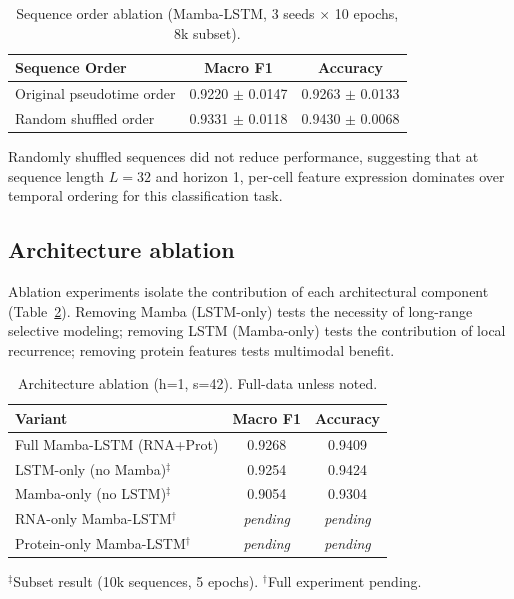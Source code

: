 \documentclass[11pt,twocolumn]{article}
\begin{document}
\begin{table}[tbp]
\centering
\caption{Sequence order ablation (Mamba-LSTM, 3 seeds $\times$ 10 epochs, 8k subset).}
\label{tab:sequence}
\footnotesize
\setlength{\tabcolsep}{3pt}
\renewcommand{\arraystretch}{1.08}
\begin{tabularx}{\columnwidth}{@{}>{\raggedright\arraybackslash}Xcc@{}}
\toprule
\textbf{Sequence Order} & \textbf{Macro F1} & \textbf{Accuracy} \\
\midrule
Original pseudotime order & 0.9220 $\pm$ 0.0147 & 0.9263 $\pm$ 0.0133 \\
Random shuffled order & 0.9331 $\pm$ 0.0118 & 0.9430 $\pm$ 0.0068 \\
\bottomrule
\end{tabularx}
\vspace{2pt}
{\footnotesize Randomly shuffled sequences did not reduce performance, suggesting that at sequence length $L=32$ and horizon 1, per-cell feature expression dominates over temporal ordering for this classification task.}
\end{table}

\subsection{Architecture ablation}

Ablation experiments isolate the contribution of each architectural component (Table~\ref{tab:ablation}). Removing Mamba (LSTM-only) tests the necessity of long-range selective modeling; removing LSTM (Mamba-only) tests the contribution of local recurrence; removing protein features tests multimodal benefit.

\begin{table}[tbp]
\centering
\caption{Architecture ablation (h=1, s=42). Full-data unless noted.}
\label{tab:ablation}
\footnotesize
\setlength{\tabcolsep}{3pt}
\renewcommand{\arraystretch}{1.08}
\begin{tabularx}{\columnwidth}{@{}>{\raggedright\arraybackslash}Xcc@{}}
\toprule
\textbf{Variant} & \textbf{Macro F1} & \textbf{Accuracy} \\
\midrule
Full Mamba-LSTM (RNA+Prot) & 0.9268 & 0.9409 \\
LSTM-only (no Mamba)$^\ddagger$ & 0.9254 & 0.9424 \\
Mamba-only (no LSTM)$^\ddagger$ & 0.9054 & 0.9304 \\
RNA-only Mamba-LSTM$^\dagger$ & \textit{pending} & \textit{pending} \\
Protein-only Mamba-LSTM$^\dagger$ & \textit{pending} & \textit{pending} \\
\bottomrule
\end{tabularx}
\vspace{2pt}
{\footnotesize $^\ddagger$Subset result (10k sequences, 5 epochs). $^\dagger$Full experiment pending.}
\end{table}
\end{document}
